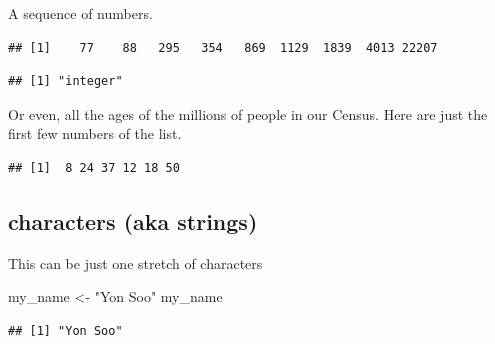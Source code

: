 \documentclass[]{book}
\newenvironment{Shaded}{\begin{snugshade}}{\end{snugshade}}
\newcommand{\KeywordTok}[1]{\textcolor[rgb]{0.13,0.29,0.53}{\textbf{#1}}}
\newcommand{\StringTok}[1]{\textcolor[rgb]{0.31,0.60,0.02}{#1}}
\newcommand{\OperatorTok}[1]{\textcolor[rgb]{0.81,0.36,0.00}{\textbf{#1}}}
\newcommand{\NormalTok}[1]{#1}
\theoremstyle{definition}
\theoremstyle{definition}
\theoremstyle{definition}
\theoremstyle{remark}
\begin{document}
A sequence of numbers.

\begin{Shaded}
\end{Shaded}

\begin{verbatim}
## [1]    77    88   295   354   869  1129  1839  4013 22207
\end{verbatim}

\begin{Shaded}
\end{Shaded}

\begin{verbatim}
## [1] "integer"
\end{verbatim}

Or even, all the ages of the millions of people in our Census. Here are
just the first few numbers of the list.

\begin{Shaded}
\end{Shaded}

\begin{verbatim}
## [1]  8 24 37 12 18 50
\end{verbatim}

\subsection{characters (aka strings)}\label{characters-aka-strings}

This can be just one stretch of characters

\begin{Shaded}
\begin{Highlighting}[]
\NormalTok{my_name <-}\StringTok{ "Yon Soo"}
\NormalTok{my_name}
\end{Highlighting}
\end{Shaded}

\begin{verbatim}
## [1] "Yon Soo"
\end{verbatim}
\end{document}
